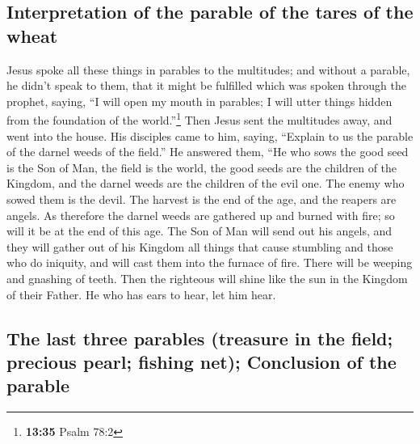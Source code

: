 \begin{paracol}{2}
\begin{otherlanguage}{english}
\hypertarget{interpretation-of-the-parable-of-the-tares-of-the-wheat}{%
\subsection{Interpretation of the parable of the tares of the
wheat}\label{interpretation-of-the-parable-of-the-tares-of-the-wheat}}

 Jesus spoke all these things in parables to the
multitudes; and without a parable, he didn't speak to them,
 that it might be fulfilled which was spoken through the
prophet, saying, ``I will open my mouth in parables; I will utter things
hidden from the foundation of the world.''\footnote{\textbf{13:35} Psalm
  78:2}  Then Jesus sent the multitudes away, and went
into the house. His disciples came to him, saying, ``Explain to us the
parable of the darnel weeds of the field.''  He answered
them, ``He who sows the good seed is the Son of Man,  the
field is the world, the good seeds are the children of the Kingdom, and
the darnel weeds are the children of the evil one.  The
enemy who sowed them is the devil. The harvest is the end of the age,
and the reapers are angels.  As therefore the darnel
weeds are gathered up and burned with fire; so will it be at the end of
this age.  The Son of Man will send out his angels, and
they will gather out of his Kingdom all things that cause stumbling and
those who do iniquity,  and will cast them into the
furnace of fire. There will be weeping and gnashing of teeth.
 Then the righteous will shine like the sun in the
Kingdom of their Father. He who has ears to hear, let him hear.

\hypertarget{the-last-three-parables-treasure-in-the-field-precious-pearl-fishing-net-conclusion-of-the-parable}{%
\subsection{The last three parables (treasure in the field; precious
pearl; fishing net); Conclusion of the
parable}\label{the-last-three-parables-treasure-in-the-field-precious-pearl-fishing-net-conclusion-of-the-parable}}


\end{otherlanguage}
\end{paracol}

